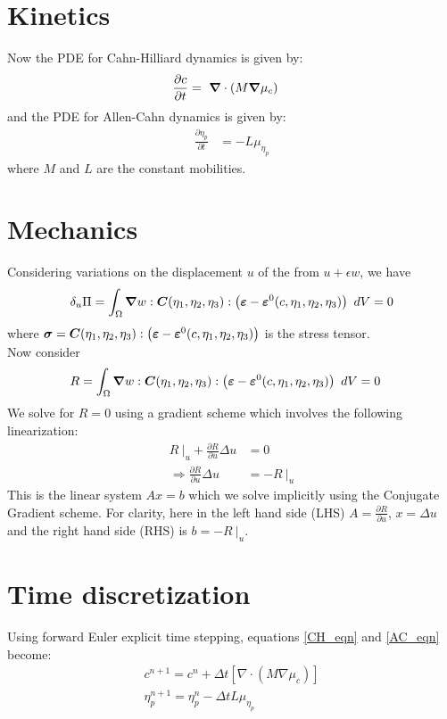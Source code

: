 \documentclass[11pt]{article}
\newcommand{\gv}[1]{\ensuremath{\mbox{\boldmath$ #1 $}}}
\newcommand{\grad}[1]{\gv{\nabla} #1} %
\renewcommand{\=}[1]{\stackrel{#1}{=}} %
\theoremstyle{definition}
\theoremstyle{remark}
\def\Bsigma{\mbox{\boldmath$\sigma$}}
\def\Bvarepsilon{\mbox{\boldmath$\varepsilon$}}
\def\bC{\mbox{\boldmath$ C$}}
\begin{document}
\section{Kinetics}
Now the PDE for Cahn-Hilliard dynamics is given by:
\begin{align}
  \frac{\partial c}{\partial t} &= ~\grad \cdot (M \grad \mu_c) \label{CH_eqn}
  \end{align}
  and the PDE for Allen-Cahn dynamics is given by:
  \begin{align}
    \frac{\partial \eta_p}{\partial t} &= - L \mu_{\eta_p} \label{AC_eqn}
\end{align}
where $M$ and $L$ are the constant mobilities. 

\section{Mechanics}
Considering variations on the displacement $u$ of the from $u+\epsilon w$, we have
\begin{align}
\delta_u \Pi &=  \int_{\Omega}   \grad w :  \bC(\eta_1, \eta_2, \eta_3) : \left( \Bvarepsilon - \Bvarepsilon^0(c,\eta_1, \eta_2, \eta_3)\right) ~dV = 0 \\
\end{align}
where $\Bsigma = \bC(\eta_1, \eta_2, \eta_3) : \left( \Bvarepsilon - \Bvarepsilon^0(c,\eta_1, \eta_2, \eta_3)\right)$ is the stress tensor. \\

Now consider\\
\begin{align}
R &=  \int_{\Omega}   \grad w :  \bC(\eta_1, \eta_2, \eta_3) : \left( \Bvarepsilon - \Bvarepsilon^0(c,\eta_1, \eta_2, \eta_3)\right) ~dV = 0 
\end{align}
We solve for $R=0$ using a gradient scheme which involves the following linearization:
\begin{align}
R~|_{u}+ \frac{\partial R}{\partial u} \Delta u &= 0 \\
\Rightarrow \frac{\partial R}{\partial u} \Delta u &= -R~|_{u}
\end{align}
This is the linear system $Ax=b$ which we solve implicitly using the Conjugate Gradient scheme. For clarity, here in the left hand side (LHS) $A=\frac{\partial R}{\partial u}$, $x=\Delta u$ and the right hand side (RHS) is $b=-R~|_{u}$.


\section{Time discretization}
Using forward Euler explicit time stepping, equations \ref{CH_eqn} and \ref{AC_eqn} become:
\begin{align}
c^{n+1} = c^{n}+\Delta t [\nabla \cdot (M \nabla \mu_c) ]\\
\eta_p^{n+1} = \eta_p^n -\Delta t L \mu_{\eta_p}
\end{align}
\end{document}

